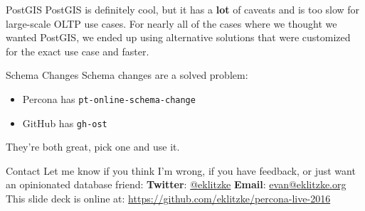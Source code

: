 \documentclass[14pt]{beamer}
\begin{document}
\begin{frame}{PostGIS}
  PostGIS is definitely cool, but it has a \textbf{lot} of caveats and is too
  slow for large-scale OLTP use cases.
  \newline
  \newline
  For nearly all of the cases where we thought we wanted PostGIS, we ended up
  using alternative solutions that were customized for the exact use case and
  faster.
\end{frame}

\begin{frame}{Schema Changes}
  Schema changes are a solved problem:
  \begin{itemize}
    \item Percona has \texttt{pt-online-schema-change}
    \item GitHub has \texttt{gh-ost}
  \end{itemize}
  They're both great, pick one and use it.
\end{frame}

\begin{frame}{Contact}
  Let me know if you think I'm wrong, if you have feedback, or just want an
  opinionated database friend:
  \newline
  \newline
  \textbf{Twitter}: \href{https://twitter.com/eklitzke}{@eklitzke}
  \newline
  \textbf{Email}: \href{mailto:evan@eklitzke.org}{evan@eklitzke.org}
  \newline
  \newline
  This slide deck is online at:
  \href{https://github.com/eklitzke/percona-live-2016}{https://github.com/eklitzke/percona-live-2016}
\end{frame}
\end{document}
